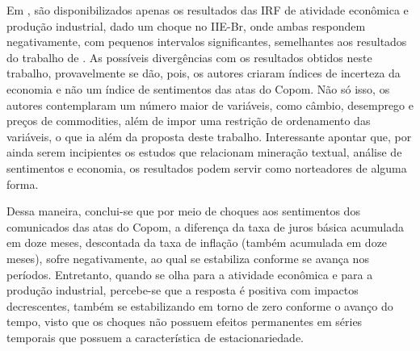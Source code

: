 Em , são disponibilizados apenas os resultados das IRF de atividade econômica e produção industrial, dado um choque no IIE-Br, onde ambas respondem negativamente, com pequenos intervalos significantes, semelhantes aos resultados do trabalho de . As possíveis divergências com os resultados obtidos neste trabalho, provavelmente se dão, pois, os autores criaram índices de incerteza da economia e não um índice de sentimentos das atas do Copom. Não só isso, os autores contemplaram um número maior de variáveis, como câmbio, desemprego e preços de commodities, além de impor uma restrição de ordenamento das variáveis, o que ia além da proposta deste trabalho. Interessante apontar que, por ainda serem incipientes os estudos que relacionam mineração textual, análise de sentimentos e economia, os resultados podem servir como norteadores de alguma forma.

Dessa maneira, conclui-se que por meio de choques aos sentimentos dos comunicados das atas do Copom, a diferença da taxa de juros básica acumulada em doze meses, descontada da taxa de inflação (também acumulada em doze meses), sofre negativamente, ao qual se estabiliza conforme se avança nos períodos. Entretanto, quando se olha para a atividade econômica e para a produção industrial, percebe-se que a resposta é positiva com impactos decrescentes, também se estabilizando em torno de zero conforme o avanço do tempo, visto que os choques não possuem efeitos permanentes em séries temporais que possuem a característica de estacionariedade. 
